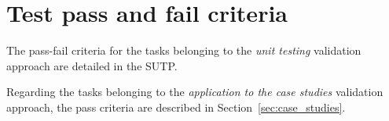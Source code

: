 \section{Test pass and fail criteria}
The pass-fail criteria for the tasks belonging to the \emph{unit testing} validation approach are detailed in the SUTP.

Regarding the tasks belonging to the \emph{application to the case studies} validation approach, the pass criteria are described in Section~\ref{sec:case_studies}.


%
%
%
%
%

\clearpage
